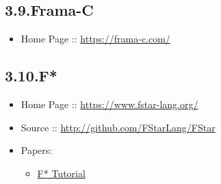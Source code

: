 \documentclass[12pt,twoside]{article}
\begin{document}
\subsection{3.9.\hspace*{0.5em}Frama-C}\label{sec-frama-c}%

\begin{itemize}[noitemsep,topsep=\mdcompacttopsep]%

\item{}Home Page :: \href{https://frama-c.com/}{{\ttfamily https://\hspace{0pt}frama-\hspace{0pt}c.\hspace{0pt}com/\hspace{0pt}}}%
\end{itemize}%

\subsection{3.10.\hspace*{0.5em}F*}\label{sec-f-}%

\begin{itemize}%

\item{}
Home Page :: \href{https://www.fstar-lang.org/}{{\ttfamily https://\hspace{0pt}www.\hspace{0pt}fstar-\hspace{0pt}lang.\hspace{0pt}org/\hspace{0pt}}}%

\item{}
Source :: \href{http://github.com/FStarLang/FStar}{{\ttfamily http://\hspace{0pt}github.\hspace{0pt}com/\hspace{0pt}FStarLang/\hspace{0pt}FStar}}%

\item{}
Papers:%

\begin{itemize}[noitemsep,topsep=\mdcompacttopsep]%

\item{}\href{https://www.fstar-lang.org/tutorial/}{F* Tutorial}%
\end{itemize}%
\end{itemize}%
\end{document}
